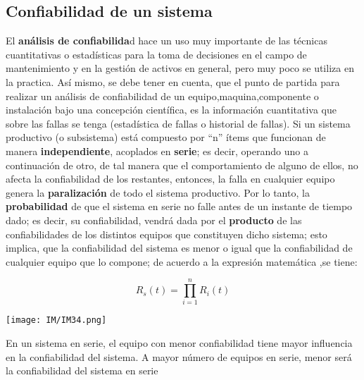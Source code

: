 \documentclass[
	12pt, %
	fleqn, %
	a4paper, %
	oneside, %
]{LegrandOrangeBook}
\begin{document}
\subsection{Confiabilidad de un sistema}
El \textbf{análisis de confiabilida}d hace un uso muy importante de las técnicas cuantitativas o estadísticas para la toma de decisiones en el campo de mantenimiento y en la gestión de activos en general, pero muy poco se utiliza en la practica. Así mismo, se debe tener en cuenta, que el punto de partida para realizar un análisis de confiabilidad de un equipo,maquina,componente o instalación bajo una concepción científica, es la información cuantitativa que sobre las fallas se tenga (estadística de fallas o historial de fallas).
Si un sistema productivo (o subsistema) está compuesto por ``n'' ítems que funcionan de manera \textbf{independiente}, acoplados en \textbf{serie}; es decir, operando uno a continuación de otro, de tal manera que el comportamiento de alguno de ellos, no afecta la confiabilidad de los restantes, entonces, la falla en cualquier equipo genera la \textbf{paralización} de todo el sistema productivo. Por lo tanto, la \textbf{probabilidad} de que el sistema en serie no falle antes de un instante de tiempo dado; es decir, su confiabilidad, vendrá dada por el \textbf{producto} de las confiabilidades de los distintos equipos que constituyen dicho sistema; esto implica, que la confiabilidad del sistema es menor o igual que la confiabilidad de cualquier equipo que lo compone; de acuerdo a la expresión matemática ,se tiene:
\begin{definition}
\begin{equation}
R_s(t)=\prod_{i=1}^nR_i(t)
\end{equation}
\begin{center}
\texttt{[image: IM/IM34.png]}
\end{center}
\end{definition}
\begin{remark}
En un sistema en serie, el equipo con menor confiabilidad tiene mayor influencia en la confiabilidad del sistema. A mayor número de equipos en serie, menor será la confiabilidad del sistema en serie
\end{remark}
\end{document}
